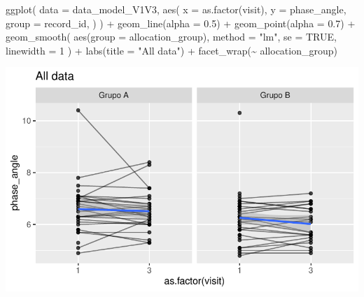 \documentclass[
  12pt,
]{article}
\newenvironment{Shaded}{\begin{snugshade}}{\end{snugshade}}
\newcommand{\AttributeTok}[1]{\textcolor[rgb]{0.40,0.45,0.13}{#1}}
\newcommand{\ConstantTok}[1]{\textcolor[rgb]{0.56,0.35,0.01}{#1}}
\newcommand{\DecValTok}[1]{\textcolor[rgb]{0.68,0.00,0.00}{#1}}
\newcommand{\FloatTok}[1]{\textcolor[rgb]{0.68,0.00,0.00}{#1}}
\newcommand{\FunctionTok}[1]{\textcolor[rgb]{0.28,0.35,0.67}{#1}}
\newcommand{\NormalTok}[1]{\textcolor[rgb]{0.00,0.23,0.31}{#1}}
\newcommand{\SpecialCharTok}[1]{\textcolor[rgb]{0.37,0.37,0.37}{#1}}
\newcommand{\StringTok}[1]{\textcolor[rgb]{0.13,0.47,0.30}{#1}}
\begin{document}
\begin{Shaded}
\begin{Highlighting}[]
\FunctionTok{ggplot}\NormalTok{(}
    \AttributeTok{data =}\NormalTok{ data\_model\_V1V3, }
    \FunctionTok{aes}\NormalTok{(}
        \AttributeTok{x =} \FunctionTok{as.factor}\NormalTok{(visit),}
        \AttributeTok{y =}\NormalTok{ phase\_angle,}
        \AttributeTok{group =}\NormalTok{ record\_id,}
\NormalTok{    )}
\NormalTok{) }\SpecialCharTok{+}
    \FunctionTok{geom\_line}\NormalTok{(}\AttributeTok{alpha =} \FloatTok{0.5}\NormalTok{) }\SpecialCharTok{+}
    \FunctionTok{geom\_point}\NormalTok{(}\AttributeTok{alpha =} \FloatTok{0.7}\NormalTok{) }\SpecialCharTok{+}
    \FunctionTok{geom\_smooth}\NormalTok{(}
        \FunctionTok{aes}\NormalTok{(}\AttributeTok{group =}\NormalTok{ allocation\_group),}
        \AttributeTok{method =} \StringTok{"lm"}\NormalTok{,}
        \AttributeTok{se =} \ConstantTok{TRUE}\NormalTok{,}
        \AttributeTok{linewidth =} \DecValTok{1}
\NormalTok{    ) }\SpecialCharTok{+}
    \FunctionTok{labs}\NormalTok{(}\AttributeTok{title =} \StringTok{"All data"}\NormalTok{) }\SpecialCharTok{+}
    \FunctionTok{facet\_wrap}\NormalTok{(}\SpecialCharTok{\textasciitilde{}}\NormalTok{ allocation\_group)}
\end{Highlighting}
\end{Shaded}

\includegraphics{Outcomes_files/figure-pdf/phase_angle_6-1.pdf}
\end{document}
